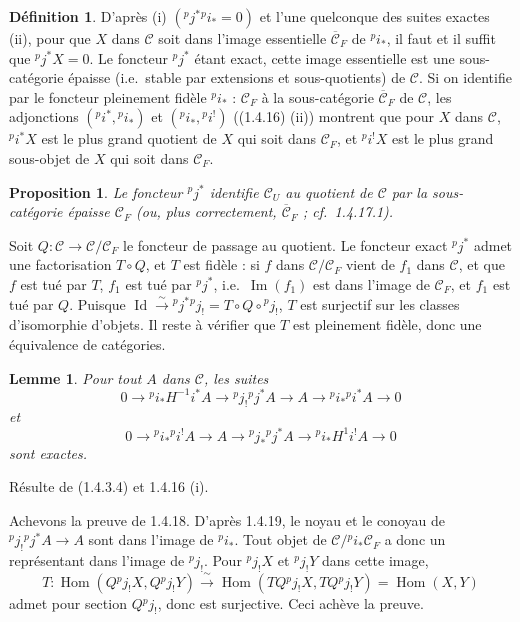 \documentclass[12pt,a4paper]{article}
\theoremstyle{plain}
\newtheorem{lemma}[theorem]{Lemme}
\newtheorem{proposition}[theorem]{Proposition}
\theoremstyle{definition}
\newtheorem{definition}[theorem]{D\'efinition}
\DeclareMathOperator{\Hom}{Hom}
\DeclareMathOperator{\im}{Im}
\DeclareMathOperator{\Id}{Id}
\begin{document}
\begin{definition}\label{def:1.4.17.1}
D'apr\`es (i) $({}^p j^* {}^p i_* = 0)$ et l'une quelconque des suites exactes (ii), pour que $X$ dans $\mathcal{C}$ soit dans l'image essentielle $\overline{\mathcal{C}}_F$ de ${}^p i_*$, il faut et il suffit que ${}^p j^* X = 0$. Le foncteur ${}^p j^*$ \'etant exact, cette image essentielle est une sous-cat\'egorie \'epaisse (i.e.\ stable par extensions et sous-quotients) de $\mathcal{C}$. Si on identifie par le foncteur pleinement fid\`ele ${}^p i_*$ : $\mathcal{C}_F$ \`a la sous-cat\'egorie $\overline{\mathcal{C}}_F$ de $\mathcal{C}$, les adjonctions $({}^p i^*, {}^p i_*)$ et $({}^p i_*, {}^p i^!)$ ((1.4.16) (ii)) montrent que pour $X$ dans $\mathcal{C}$, ${}^p i^* X$ est le plus grand quotient de $X$ qui soit dans $\mathcal{C}_F$, et ${}^p i^! X$ est le plus grand sous-objet de $X$ qui soit dans $\mathcal{C}_F$.
\end{definition}

\begin{proposition}\label{prop:1.4.18}
Le foncteur ${}^p j^*$ identifie $\mathcal{C}_U$ au quotient de $\mathcal{C}$ par la sous-cat\'egorie \'epaisse $\mathcal{C}_F$ (ou, plus correctement, $\overline{\mathcal{C}}_F$ ; cf.~1.4.17.1).
\end{proposition}

Soit $Q : \mathcal{C} \to \mathcal{C}/\mathcal{C}_F$ le foncteur de passage au quotient. Le foncteur exact ${}^p j^*$ admet une factorisation $T \circ Q$, et $T$ est fid\`ele : si $f$ dans $\mathcal{C}/\mathcal{C}_F$ vient de $f_1$ dans $\mathcal{C}$, et que $f$ est tu\'e par $T$, $f_1$ est tu\'e par ${}^p j^*$, i.e.\ $\im(f_1)$ est dans l'image de $\mathcal{C}_F$, et $f_1$ est tu\'e par $Q$. Puisque $\Id \xrightarrow{\sim} {}^p j^* {}^p j_! = T \circ Q \circ {}^p j_!$, $T$ est surjectif sur les classes d'isomorphie d'objets. Il reste \`a v\'erifier que $T$ est pleinement fid\`ele, donc une \'equivalence de cat\'egories.

\begin{lemma}\label{lem:1.4.19}
Pour tout $A$ dans $\mathcal{C}$, les suites
\[
0 \to {}^p i_* H^{-1} i^* A \to {}^p j_! {}^p j^* A \to A \to {}^p i_* {}^p i^* A \to 0
\]
et
\[
0 \to {}^p i_* {}^p i^! A \to A \to {}^p j_* {}^p j^* A \to {}^p i_* H^1 i^! A \to 0
\]
sont exactes.
\end{lemma}

R\'esulte de (1.4.3.4) et 1.4.16 (i).

Achevons la preuve de 1.4.18. D'apr\`es 1.4.19, le noyau et le conoyau de ${}^p j_! {}^p j^* A \to A$ sont dans l'image de ${}^p i_*$. Tout objet de $\mathcal{C}/{}^p i_* \mathcal{C}_F$ a donc un repr\'esentant dans l'image de ${}^p j_!$. Pour ${}^p j_! X$ et ${}^p j_! Y$ dans cette image,
\[
T : \Hom(Q {}^p j_! X, Q {}^p j_! Y) \xrightarrow{\;\sim\;} \Hom(T Q {}^p j_! X, T Q {}^p j_! Y) = \Hom(X,Y)
\]
admet pour section $Q {}^p j_!$, donc est surjective. Ceci ach\`eve la preuve.
\end{document}
